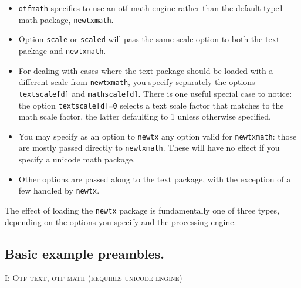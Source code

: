 \documentclass[\fsc]{article}
\theoremstyle{oldplain}
\theoremstyle{plain}
\begin{document}
\begin{itemize}
\item {\tt otfmath} specifies to use an otf math engine rather than the default type1 math package, {\tt newtxmath}.
\item Option {\tt scale} or {\tt scaled} will pass the same {scale} option to both the text package and  {\tt newtxmath}.
\item For dealing with cases where the text package should be loaded with a different scale from {\tt newtxmath}, you specify separately the options {\tt textscale[d]} and {\tt mathscale[d]}. There is one useful special case to notice: the option {\tt textscale[d]=0} selects a text scale factor that matches to the math scale factor, the latter defaulting to 1 unless otherwise specified.
\item You may specify as an option to {\tt newtx} any option valid for {\tt newtxmath}: those are mostly passed directly to {\tt newtxmath}. These will have no effect if you specify a unicode math package.
\item Other options are passed along to the text package, with the exception of a few  handled by {\tt newtx}.
\end{itemize}

The effect of loading the {\tt newtx} package is fundamentally one of three types, depending on the options you specify and the processing engine.
\subsection{Basic example preambles.}

\textsc{I: Otf text, otf math (requires unicode engine)}
\end{document}
